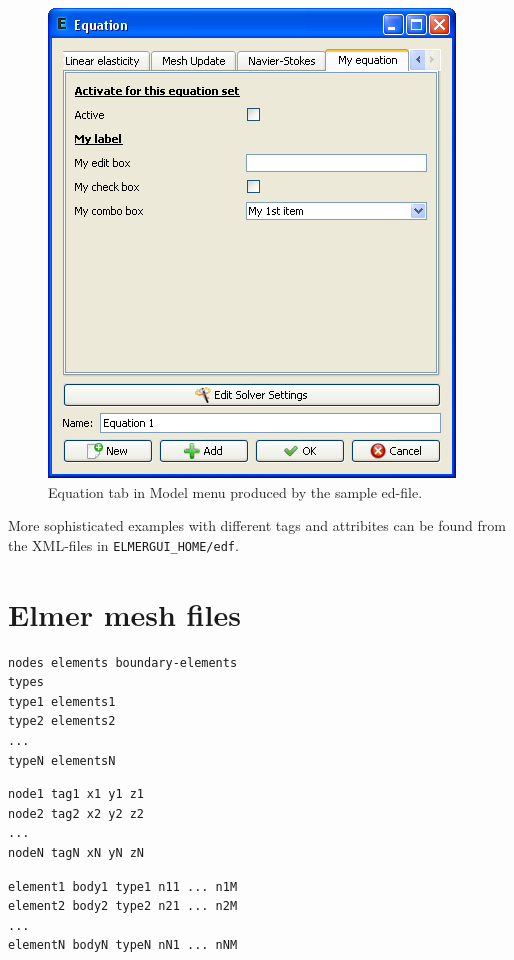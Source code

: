 \documentclass[a4paper,12pt]{article}
\begin{document}
\begin{figure}[ht]
\begin{center}
 \includegraphics[scale=0.5]{images/edfsample.png}
\caption{Equation tab in Model menu produced by the sample ed-file.}
\end{center}
\end{figure}

More sophisticated examples with different tags and attribites can be found from the XML-files in  {\tt ELMERGUI\_HOME/edf}.

\newpage

\section{Elmer mesh files}

\begin{verbatim}
nodes elements boundary-elements
types
type1 elements1
type2 elements2
...
typeN elementsN
\end{verbatim}

\vskip5mm

\begin{verbatim}
node1 tag1 x1 y1 z1
node2 tag2 x2 y2 z2
...
nodeN tagN xN yN zN
\end{verbatim}

\vskip5mm

\begin{verbatim}
element1 body1 type1 n11 ... n1M
element2 body2 type2 n21 ... n2M
...
elementN bodyN typeN nN1 ... nNM
\end{verbatim}
\end{document}
